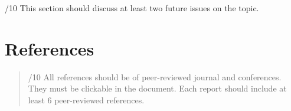 \documentclass[conference]{IEEEtran}
\begin{document}
/10 This section should discuss at least two future issues on the topic.

\hypertarget{references}{%
\section{References}\label{references}}

\begin{quote}
/10 All references should be of peer-reviewed journal and conferences.
They must be clickable in the document. Each report should include at
least 6 peer-reviewed references.
\end{quote}

% 

\printbibliography
\end{document}
